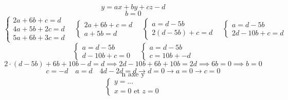 \documentclass{article}
\begin{document}
\[ y = ax+by+cz-d \]
\[ b=0 \]
\[ \begin{cases} 2a+6b+c=d \\ 4a+5b+2c=d \\ 5a+6b+3c=d \end{cases} \quad \begin{cases} 2a+6b+c=d \\ a+5b=d \end{cases} \quad \begin{cases} a=d-5b \\ 2(d-5b)+c=d \end{cases} \quad \begin{cases} a=d-5b \\ 2d-10b+c=d \end{cases}\]
\[ \begin{cases} a=d-5b \\ d-10b+c=0 \end{cases} \quad \begin{cases} a=d-5b \\ c=10b+-d \end{cases} \]
\[2 \cdot (d-5b) + 6b + 10b - d = d  \implies 2d - 10b + 6b + 10b = 2d \implies 6b = 0 \implies b=0\]
\[ c = -d \quad a = d \quad 4d-2d=d \rightarrow d=0 \rightarrow a=0 \rightarrow c=0 \]
\[ \text{n axe y} \]
\[ \begin{cases} y=... \\ x=0 \text{ et } z=0 \end{cases} \]
\end{document}

